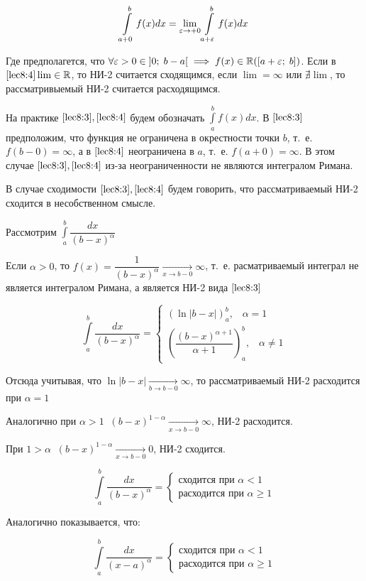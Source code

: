 \documentclass[../../main.tex]{subfiles}
\begin{document}
\begin{equation} \label{lec8:4}
 \int\limits_{a + 0}^{b}f(x)dx = \underset{\varepsilon \to +0}\lim \int\limits_{a + 
 \varepsilon}^{b}f(x)dx
\end{equation}

Где предполагется, что $\forall \varepsilon > 0 \in \left]0;\; b - a\right[ \implies 
f(x) \in \mathbb{R}(\left[a + \varepsilon;\; b\right])$. Если в $\eqref{lec8:4} \lim \in \mathbb{R}$, 
то НИ-2 считается сходящимся, если $\lim = \infty$ или $\nexists \lim$, то 
рассматривыемый НИ-2 считается расходящимся.

На практике $\eqref{lec8:3}, \eqref{lec8:4}$ будем обозначать 
$\displaystyle\int\limits_{a}^{b}f(x)dx$. В $\eqref{lec8:3}$ предположим, что 
функция не ограничена в окрестности точки $b$, т.~е. $f(b - 0) = \infty$, а в 
$\eqref{lec8:4}$ неограничена в $a$, т.~е. $f(a + 0) = \infty$. В этом случае 
$\eqref{lec8:3}, \eqref{lec8:4}$ из-за неограниченности не являются интегралом 
Римана.

В случае сходимости $\eqref{lec8:3}, \eqref{lec8:4}$ будем говорить, что 
рассматриваемый НИ-2 сходится в несобственном смысле.

\begin{exmp}
 Рассмотрим $\displaystyle\int\limits_{a}^{b}\dfrac{dx}{(b - x)^{\alpha}}$
 
 Если $\alpha > 0$, то $f(x) = \dfrac{1}{(b -x)^{\alpha}} \xrightarrow[x \to b 
 - 0]{} \infty$, т.~е. расматриваемый интеграл не является интегралом Римана, 
 а является НИ-2 вида $\eqref{lec8:3}$
 
 \[\int\limits_{a}^{b}\dfrac{dx}{(b - x)^{\alpha}} =
 \begin{cases}
 \left(\ln|b - x|\right)_{a}^{b},\;\;\; \alpha = 1\\
 \left(\dfrac{(b - x)^{\alpha + 1}}{\alpha + 1}\right)_{a}^{b},\;\;\; \alpha 
 \neq 1 
\end{cases}\]

Отсюда учитывая, что $\ln|b - x| \xrightarrow[b \to b - 0]{} \infty$, то 
рассматриваемый НИ-2 расходится при $\alpha = 1$

Аналогично при $\alpha > 1 \;\;(b - x)^{1- \alpha} \xrightarrow[x \to b - 0]{} 
\infty$, НИ-2 расходится.

При $1 > \alpha \;\; (b - x)^{1 - \alpha} \xrightarrow[x \to b - 0]{} 0$, НИ-2 
сходится.

\[\int\limits_{a}^{b} \dfrac{dx}{(b - x)^{\alpha}} = 
\begin{cases}
\text{сходится при } \alpha < 1\\
\text{расходится при } \alpha \geq 1
\end{cases}\]

Аналогично показывается, что:

\[\int\limits_{a}^{b} \dfrac{dx}{(x - a)^{\alpha}} = 
\begin{cases}
\text{сходится при } \alpha < 1\\
\text{расходится при } \alpha \geq 1
\end{cases}\]
\end{exmp}
\end{document}
